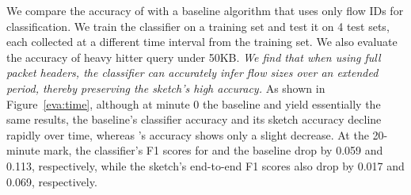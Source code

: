 %
We compare the accuracy of \alg{} with a baseline algorithm that uses only flow IDs for classification. We train the classifier on a training set and test it on 4 test sets, each collected at a different time interval from the training set. We also evaluate the accuracy of heavy hitter query under 50KB. \textit{We find that when using full packet headers, the classifier can accurately infer flow sizes over an extended period, thereby preserving the sketch’s high accuracy.}
%
As shown in Figure~\ref{eva:time}, although at minute 0 the baseline and \alg{} yield essentially the same results, the baseline’s classifier accuracy and its sketch accuracy decline rapidly over time, whereas \alg{}’s accuracy shows only a slight decrease. At the 20-minute mark, the classifier’s F1 scores for \alg{} and the baseline drop by 0.059 and 0.113, respectively, while the sketch’s end-to-end F1 scores also drop by 0.017 and 0.069, respectively.
